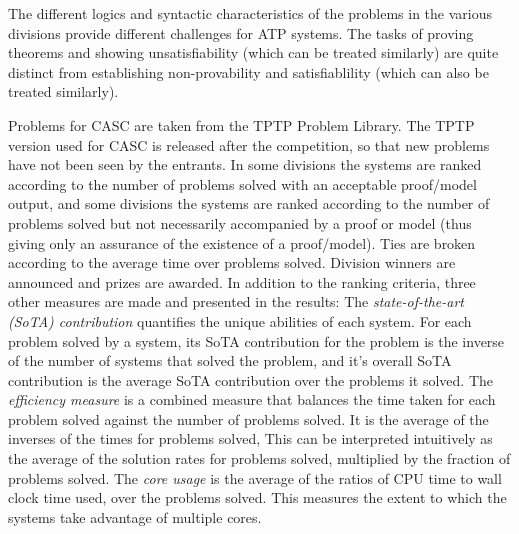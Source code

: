 \documentclass{easychair}
\begin{document}
The different logics and syntactic characteristics of the problems in the
various divisions provide different challenges for ATP systems. 
The tasks of proving theorems and showing unsatisfiability (which can
be treated similarly) are quite distinct from establishing non-provability 
and satisfiablility (which can also be treated similarly).

Problems for CASC are taken from the TPTP Problem Library. 
The TPTP version used for CASC is released after the competition,
so that new problems have not been seen by the entrants. 
In some divisions the systems are ranked according to the number of problems 
solved with an acceptable proof/model output, and some divisions the systems
are ranked according to the number of problems solved but not necessarily 
accompanied by a proof or model
(thus giving only an assurance of the existence of a proof/model). 
Ties are broken according to the average time over problems solved.
Division winners are announced and prizes are awarded.
In addition to the ranking criteria, three other measures are made and
presented in the results:
The {\em state-of-the-art (SoTA) contribution} quantifies the unique
abilities of each system.
For each problem solved by a system, its SoTA contribution for the problem 
is the inverse of the number of systems that solved the problem, and
it's overall SoTA contribution is the average SoTA contribution over 
the problems it solved.
The {\em efficiency measure} is a combined measure that balances the time
taken for each problem solved against the number of problems solved.
It is the average of the inverses of the times for problems solved,
This can be interpreted intuitively as the average of the solution rates
for problems solved, multiplied by the fraction of problems solved.
The {\em core usage} is the average of the ratios of CPU time to
wall clock time used, over the problems solved.
This measures the extent to which the systems take advantage of multiple cores.
\end{document}
